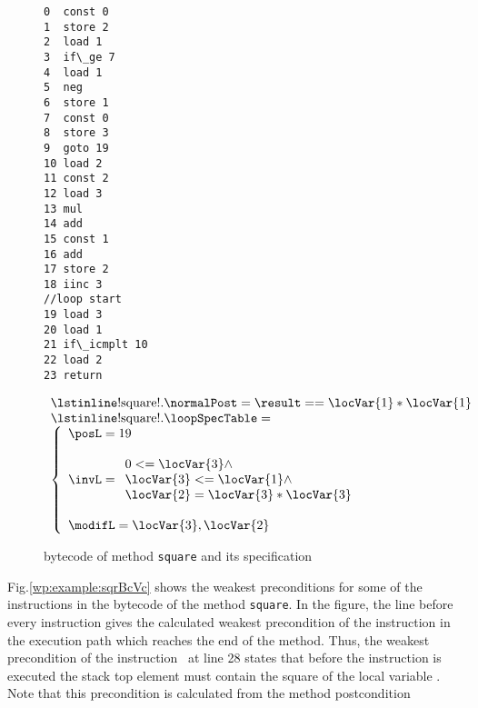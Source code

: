 \begin{figure}
\begin{minipage}[t]{32mm}
\begin{lstlisting}[frame=trbl]
0  const 0
1  store 2
2  load 1
3  if\_ge 7 
4  load 1
5  neg
6  store 1
7  const 0
8  store 3
9  goto 19 
10 load 2
11 const 2
12 load 3
13 mul
14 add
15 const 1
16 add
17 store 2
18 iinc 3
//loop start
19 load 3 
20 load 1
21 if\_icmplt 10
22 load 2
23 return
\end{lstlisting} 
\end{minipage}

\phantom{aaaaa}

\begin{minipage}[t]{20mm}
$$\begin{array}{l}
 \mbox{\rm\lstinline!square!}. \normalPost = \result == \locVar{1}* \locVar{1} \\ 
 \mbox{\rm\lstinline!square!}.\loopSpecTable =  \\
        \left\{  \begin{array}{l}  \posL   = 19 \\\\
                          \invL   =\begin{array}{l} 
                                     0 <= \locVar{3}  \wedge \\
				     \locVar{3}<= \locVar{1}   \wedge \\
                                    \locVar{2} = \locVar{3} *\locVar{3}
                                   \end{array}\\ \\
	                  \modifL =  \locVar{3}, \locVar{2}\\
			  \end{array}\right.
         \end{array}$$
\end{minipage}
\caption{\sc  bytecode of method \lstinline!square! and its specification }
\label{wp:example:sqrBc}
\end{figure}
Fig.\ref{wp:example:sqrBcVc} shows the weakest preconditions for some of the instructions in the bytecode of the method  \lstinline!square!.
In the figure, the line before every instruction gives the calculated weakest precondition of the instruction in the execution path which reaches the end 
of the method. Thus, the weakest precondition of the instruction  \return \ at line 28 states that before the instruction is executed the stack top element
\stack{\counter}  must  contain the square of the local variable . Note that this precondition is calculated from the method postcondition 
